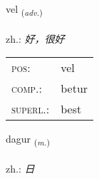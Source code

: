 \documentclass[frontgrid, backgrid]{flacards}\usepackage[]{graphicx}\usepackage[]{xcolor}
\begin{document}
{vel \small{\textsubscript{(\textit{adv.})}} \\[1ex] %
\textphonetic{[vɛːl]} \\
zh.: \emph{好，很好} \\  [2ex]
\renewcommand*{\arraystretch}{0.8}
\begin{tabular}{ll}
\textsc{pos}: & vel \\ 
\textsc{comp.}: & betur \\ 
\textsc{superl.}: & best \\
\end{tabular}
}

\renewcommand{\flhead}{\vskip5pt \fboxsep=0pt {\small\bfseries\footnotesize Nafnorð | 名词}}
\renewcommand{\fcfoot}{\vskip5pt \fboxsep=0pt \hspace{2pt}{\small\bfseries\footnotesize 1K}}

\renewcommand{\blhead}{\vskip5pt {\small\bfseries\footnotesize Nafnorð | 名词 }}
\renewcommand{\bcfoot}{\vskip5pt \hspace{2pt}{\small\bfseries\footnotesize 1K}}


{dagur \small{\textsubscript{(\textit{m.})}} \\[1ex] %
\textphonetic{[taːɣʏr]} \\
zh.: \emph{日} \\  [2ex]
\renewcommand*{\arraystretch}{0.8}
}


\renewcommand{\flhead}{\vskip5pt \fboxsep=0pt {\small\bfseries\footnotesize Samtenging | 连词}}
\renewcommand{\fcfoot}{\vskip5pt \fboxsep=0pt \hspace{2pt}{\small\bfseries\footnotesize 1K}}

\renewcommand{\blhead}{\vskip5pt {\small\bfseries\footnotesize Samtenging | 连词 }}
\renewcommand{\bcfoot}{\vskip5pt \hspace{2pt}{\small\bfseries\footnotesize 1K}}
\end{document}
